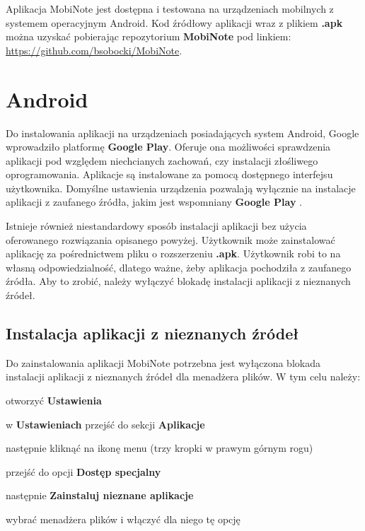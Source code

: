 \documentclass[shortabstract]{iithesis}
\begin{document}
Aplikacja MobiNote jest dostępna i testowana na urządzeniach mobilnych z systemem operacyjnym Android.
Kod źródłowy aplikacji wraz z plikiem \textbf{.apk} można uzyskać pobierając repozytorium \textbf{MobiNote} pod linkiem:
\url{https://github.com/bsobocki/MobiNote}.

\section{Android}

 Do instalowania aplikacji na urządzeniach posiadających system Android, Google wprowadziło platformę \textbf{Google Play}. Oferuje ona możliwości sprawdzenia aplikacji pod względem niechcianych zachowań, czy instalacji złośliwego oprogramowania. Aplikacje są instalowane za pomocą dostępnego interfejsu użytkownika. Domyślne ustawienia urządzenia pozwalają wyłącznie na instalacje aplikacji z zaufanego źródła, jakim jest wspomniany \textbf{Google Play} \cite{googleplay}.

Istnieje również niestandardowy sposób instalacji aplikacji bez użycia oferowanego rozwiązania opisanego powyżej. Użytkownik może zainstalować aplikację za pośrednictwem pliku o rozszerzeniu \textbf{.apk}. Użytkownik robi to na własną odpowiedzialność, dlatego ważne, żeby aplikacja pochodziła z zaufanego źródła. Aby to zrobić, należy wyłączyć blokadę instalacji aplikacji z nieznanych źródeł.

\subsection{Instalacja aplikacji z nieznanych źródeł}
Do zainstalowania aplikacji MobiNote potrzebna jest wyłączona blokada instalacji aplikacji z nieznanych źródeł dla menadżera plików.
W tym celu należy:
\begin{compactitem}
    \item otworzyć \textbf{Ustawienia}
    \item w \textbf{Ustawieniach} przejść do sekcji \textbf{Aplikacje}
    \item następnie kliknąć na ikonę menu (trzy kropki w prawym górnym rogu)
    \item przejść do opcji \textbf{Dostęp specjalny}
    \item następnie \textbf{Zainstaluj nieznane aplikacje}
    \item wybrać menadżera plików i włączyć dla niego tę opcję
\end{compactitem}
\end{document}
